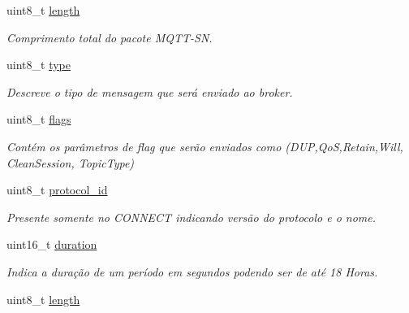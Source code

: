 \begin{DoxyCompactItemize}
\item 
\hypertarget{group__Pacotes_gaf9d495c1655d813d553030485d00fea7}{uint8\+\_\+t \hyperlink{group__Pacotes_gaf9d495c1655d813d553030485d00fea7}{length}}\label{group__Pacotes_gaf9d495c1655d813d553030485d00fea7}

\begin{DoxyCompactList}\small\item\em Comprimento total do pacote M\+Q\+T\+T-\/\+S\+N. \end{DoxyCompactList}\item 
\hypertarget{group__Pacotes_ga7aead736a07eaf25623ad7bfa1f0ee2d}{uint8\+\_\+t \hyperlink{group__Pacotes_ga7aead736a07eaf25623ad7bfa1f0ee2d}{type}}\label{group__Pacotes_ga7aead736a07eaf25623ad7bfa1f0ee2d}

\begin{DoxyCompactList}\small\item\em Descreve o tipo de mensagem que será enviado ao broker. \end{DoxyCompactList}\item 
\hypertarget{group__Pacotes_gab6b306ef981f5e21bb41ea2c2dbe8cd9}{uint8\+\_\+t \hyperlink{group__Pacotes_gab6b306ef981f5e21bb41ea2c2dbe8cd9}{flags}}\label{group__Pacotes_gab6b306ef981f5e21bb41ea2c2dbe8cd9}

\begin{DoxyCompactList}\small\item\em Contém os parâmetros de flag que serão enviados como (D\+U\+P,Qo\+S,Retain,Will, Clean\+Session, Topic\+Type) \end{DoxyCompactList}\item 
\hypertarget{group__Pacotes_gac600161f386567cf3ab274f4afbd5981}{uint8\+\_\+t \hyperlink{group__Pacotes_gac600161f386567cf3ab274f4afbd5981}{protocol\+\_\+id}}\label{group__Pacotes_gac600161f386567cf3ab274f4afbd5981}

\begin{DoxyCompactList}\small\item\em Presente somente no C\+O\+N\+N\+E\+C\+T indicando versão do protocolo e o nome. \end{DoxyCompactList}\item 
\hypertarget{group__Pacotes_ga71f530f1f32dbca56a6af8a5fbbfbe49}{uint16\+\_\+t \hyperlink{group__Pacotes_ga71f530f1f32dbca56a6af8a5fbbfbe49}{duration}}\label{group__Pacotes_ga71f530f1f32dbca56a6af8a5fbbfbe49}

\begin{DoxyCompactList}\small\item\em Indica a duração de um período em segundos podendo ser de até 18 Horas. \end{DoxyCompactList}\item 
\hypertarget{group__Pacotes_gaf9d495c1655d813d553030485d00fea7}{uint8\+\_\+t \hyperlink{group__Pacotes_gaf9d495c1655d813d553030485d00fea7}{length}}\label{group__Pacotes_gaf9d495c1655d813d553030485d00fea7}


\end{DoxyCompactItemize}
